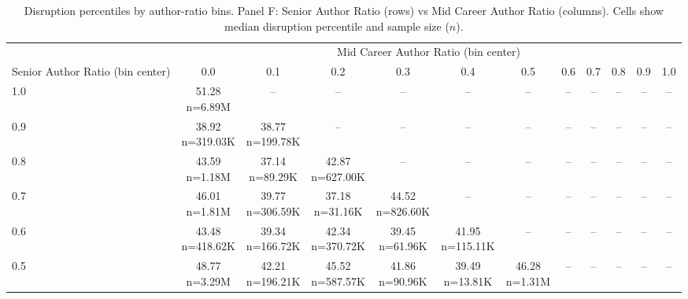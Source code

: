 \begin{table}\centering
            \caption{Disruption percentiles by author-ratio bins. Panel F: Senior Author Ratio (rows) vs Mid Career Author Ratio (columns). Cells show median disruption percentile and sample size ($n$).}
            \scriptsize
            \setlength\tabcolsep{4pt}
            \renewcommand{\arraystretch}{1.1}
            \begin{tabular}{lccccccccccc}
            \toprule
            & \multicolumn{11}{c}{Mid Career Author Ratio (bin center)} \\
            \cmidrule(lr){2-12}
            Senior Author Ratio (bin center) & 0.0 & 0.1 & 0.2 & 0.3 & 0.4 & 0.5 & 0.6 & 0.7 & 0.8 & 0.9 & 1.0 \\
            \midrule
            1.0 & \makecell{51.28 \\ \scriptsize n=6.89M} & -- & -- & -- & -- & -- & -- & -- & -- & -- & -- \\
0.9 & \makecell{38.92 \\ \scriptsize n=319.03K} & \makecell{38.77 \\ \scriptsize n=199.78K} & -- & -- & -- & -- & -- & -- & -- & -- & -- \\
0.8 & \makecell{43.59 \\ \scriptsize n=1.18M} & \makecell{37.14 \\ \scriptsize n=89.29K} & \makecell{42.87 \\ \scriptsize n=627.00K} & -- & -- & -- & -- & -- & -- & -- & -- \\
0.7 & \makecell{46.01 \\ \scriptsize n=1.81M} & \makecell{39.77 \\ \scriptsize n=306.59K} & \makecell{37.18 \\ \scriptsize n=31.16K} & \makecell{44.52 \\ \scriptsize n=826.60K} & -- & -- & -- & -- & -- & -- & -- \\
0.6 & \makecell{43.48 \\ \scriptsize n=418.62K} & \makecell{39.34 \\ \scriptsize n=166.72K} & \makecell{42.34 \\ \scriptsize n=370.72K} & \makecell{39.45 \\ \scriptsize n=61.96K} & \makecell{41.95 \\ \scriptsize n=115.11K} & -- & -- & -- & -- & -- & -- \\
0.5 & \makecell{48.77 \\ \scriptsize n=3.29M} & \makecell{42.21 \\ \scriptsize n=196.21K} & \makecell{45.52 \\ \scriptsize n=587.57K} & \makecell{41.86 \\ \scriptsize n=90.96K} & \makecell{39.49 \\ \scriptsize n=13.81K} & \makecell{46.28 \\ \scriptsize n=1.31M} & -- & -- & -- & -- & -- \\

\end{tabular}
\end{table}
